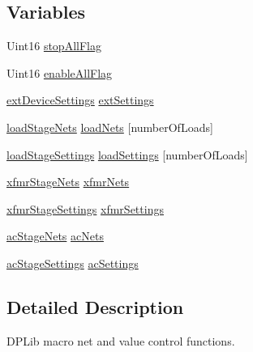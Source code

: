 \subsection*{Variables}
\begin{DoxyCompactItemize}
\item 
Uint16 \hyperlink{a00027_af6530cd8f296ed6bf84f4ce75ea4c9ad}{stop\-All\-Flag}
\item 
Uint16 \hyperlink{a00027_a65fcb0c0a483e3bc3433b17227fa29ac}{enable\-All\-Flag}
\item 
\hyperlink{a00005}{ext\-Device\-Settings} \hyperlink{a00027_ab8092749f4706406bb47ec950573ebed}{ext\-Settings}
\item 
\hyperlink{a00007}{load\-Stage\-Nets} \hyperlink{a00027_a0a6ae344146684f87fe8ca400640dced}{load\-Nets} \mbox{[}number\-Of\-Loads\mbox{]}
\item 
\hyperlink{a00008}{load\-Stage\-Settings} \hyperlink{a00027_acb0d5fe43ffb1c0edbb3d22409a8f346}{load\-Settings} \mbox{[}number\-Of\-Loads\mbox{]}
\item 
\hyperlink{a00009}{xfmr\-Stage\-Nets} \hyperlink{a00027_aec1d3b8f844d1d31ce7e703e50209432}{xfmr\-Nets}
\item 
\hyperlink{a00010}{xfmr\-Stage\-Settings} \hyperlink{a00027_ab8977a3c81ebfcd1b5dbe7fb49e9f832}{xfmr\-Settings}
\item 
\hyperlink{a00003}{ac\-Stage\-Nets} \hyperlink{a00027_ab73a0aedbde1954d7bf8091e07e4675c}{ac\-Nets}
\item 
\hyperlink{a00004}{ac\-Stage\-Settings} \hyperlink{a00027_aee11a0ac36813aa41597f992e943cd17}{ac\-Settings}
\end{DoxyCompactItemize}


\subsection{Detailed Description}
D\-P\-Lib macro net and value control functions. 

